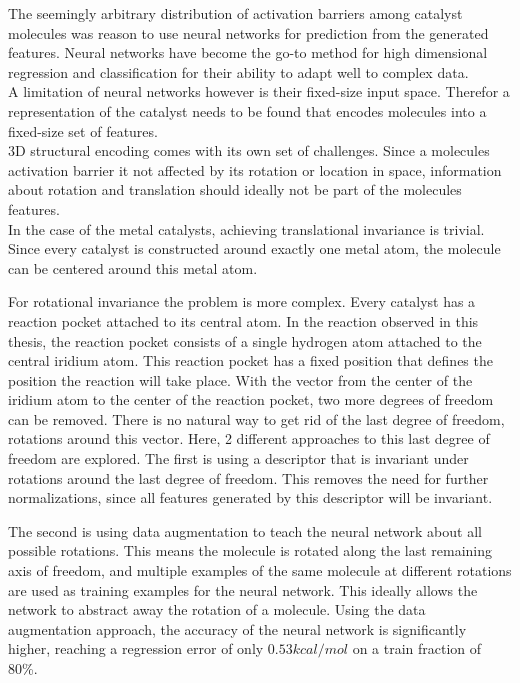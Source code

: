 The seemingly arbitrary distribution of activation barriers among catalyst molecules  was reason to use neural networks for prediction from the generated features.
Neural networks have become the go-to method for high dimensional regression and classification for their ability to adapt well to complex data.
\\
A limitation of neural networks however is their fixed-size input space.
Therefor a representation of the catalyst needs to be found that encodes molecules into a fixed-size set of features.
\\
3D structural encoding comes with its own set of challenges. 
Since a molecules activation barrier it not affected by its rotation or location in space, 
information about rotation and translation should ideally not be part of the molecules features.
\\
In the case of the metal catalysts, achieving translational invariance is trivial.
Since every catalyst is constructed around exactly one metal atom, the molecule can be centered around this metal atom.

For rotational invariance the problem is more complex.
Every catalyst has a reaction pocket attached to its central atom.
In the reaction observed in this thesis, the reaction pocket consists of a single hydrogen atom attached to the central iridium atom.
This reaction pocket has a fixed position that defines the position the reaction will take place.
With the vector from the center of the iridium atom to the center of the reaction pocket, two more degrees of freedom can be removed.
There is no natural way to get rid of the last degree of freedom, rotations around this vector.
Here, 2 different approaches to this last degree of freedom are explored.
The first is using a descriptor that is invariant under rotations around the last degree of freedom.
This removes the need for further normalizations, since all features generated by this descriptor will be invariant.

The second is using data augmentation to teach the neural network about all possible rotations.
This means the molecule is rotated along the last remaining axis of freedom, and multiple examples of the same molecule at different rotations are used as training examples for the neural network.
This ideally allows the network to abstract away the rotation of a molecule.
Using the data augmentation approach, the accuracy of the neural network is significantly higher, reaching a regression error of only  $0.53 kcal/mol$ on a train fraction of 80\%.

